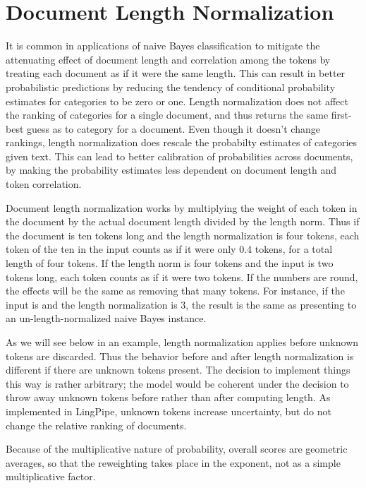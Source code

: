 \section{Document Length Normalization}\label{section:naive-bayes-length-norm}

It is common in applications of naive Bayes classification to mitigate
the attenuating effect of document length and correlation among the
tokens by treating each document as if it were the same length.  This
can result in better probabilistic predictions by reducing the
tendency of conditional probability estimates for categories to be
zero or one.  Length normalization does not affect the ranking of
categories for a single document, and thus returns the same first-best
guess as to category for a document.  Even though it doesn't change
rankings, length normalization does rescale the probabilty estimates
of categories given text.  This can lead to better calibration of
probabilities across documents, by making the probability estimates
less dependent on document length and token correlation.

Document length normalization works by multiplying the weight of each
token in the document by the actual document length divided by the
length norm.  Thus if the document is ten tokens long and the length
normalization is four tokens, each token of the ten in the input
counts as if it were only 0.4 tokens, for a total length of four
tokens.  If the length norm is four tokens and the input is two tokens
long, each token counts as if it were two tokens.  If the numbers are
round, the effects will be the same as removing that many tokens.  For
instance, if the input is  and
the length normalization is 3, the result is the same as presenting
 to an un-length-normalized naive Bayes
instance.

As we will see below in an example, length normalization applies
before unknown tokens are discarded.  Thus the behavior before and
after length normalization is different if there are unknown tokens
present.  The decision to implement things this way is rather
arbitrary; the model would be coherent under the decision to throw
away unknown tokens before rather than after computing length.  As
implemented in LingPipe, unknown tokens increase uncertainty, but
do not change the relative ranking of documents.  

Because of the multiplicative nature of probability, overall
scores are geometric averages, so that the reweighting takes place
in the exponent, not as a simple multiplicative factor.


